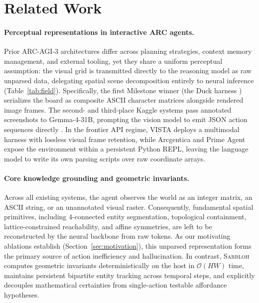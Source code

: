 \section{Related Work}
\label{sec:related}

\paragraph{Perceptual representations in interactive ARC agents.}
Prior ARC-AGI-3 architectures differ across planning strategies, context memory management, and external tooling, yet they share a uniform perceptual assumption: the visual grid is transmitted directly to the reasoning model as raw unparsed data, delegating spatial scene decomposition entirely to neural inference (Table~\ref{tab:field}). 
Specifically, the first Milestone winner (the Duck harness \citep{duck2026,arcprizemilestone1}) serializes the board as composite ASCII character matrices alongside rendered image frames. The second- and third-place Kaggle systems pass annotated screenshots to Gemma-4-31B, prompting the vision model to emit JSON action sequences directly \citep{arcprizemilestone1}. In the frontier API regime, VISTA \citep{vista2026} deploys a multimodal harness with lossless visual frame retention, while Arcgentica \citep{knutsen2026arcgentica} and Prime Agent \citep{karten2026prime} expose the environment within a persistent Python REPL, leaving the language model to write its own parsing scripts over raw coordinate arrays.

\paragraph{Core knowledge grounding and geometric invariants.}
Across all existing systems, the agent observes the world as an integer matrix, an ASCII string, or an unannotated visual raster. Consequently, fundamental spatial primitives, including 4-connected entity segmentation, topological containment, lattice-constrained reachability, and affine symmetries, are left to be reconstructed by the neural backbone from raw tokens. As our motivating ablations establish (Section~\ref{sec:motivation}), this unparsed representation forms the primary source of action inefficiency and hallucination. In contrast, \textsc{Sarbloh} computes geometric invariants deterministically on the host in $\mathcal{O}(HW)$ time, maintains persistent bipartite entity tracking across temporal steps, and explicitly decouples mathematical certainties from single-action testable affordance hypotheses.

